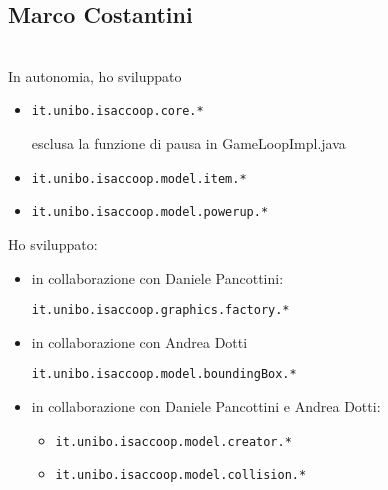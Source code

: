 \documentclass[a4paper,12pt]{report}
\begin{document}
\subsection*{Marco Costantini}
\\In autonomia, ho sviluppato
\begin{itemize}
    \item \begin{verbatim}it.unibo.isaccoop.core.* \end{verbatim} esclusa la funzione di pausa in GameLoopImpl.java
    \item \begin{verbatim}it.unibo.isaccoop.model.item.* \end{verbatim}
    \item \begin{verbatim}it.unibo.isaccoop.model.powerup.* \end{verbatim}
\end{itemize}
Ho sviluppato: 
\begin{itemize}
    \item in collaborazione con Daniele Pancottini: \begin{verbatim}it.unibo.isaccoop.graphics.factory.* \end{verbatim}
    \item in collaborazione con Andrea Dotti \begin{verbatim}it.unibo.isaccoop.model.boundingBox.* \end{verbatim}
    \item in collaborazione con Daniele Pancottini e Andrea Dotti:  
    \begin{itemize}
        \item \begin{verbatim}it.unibo.isaccoop.model.creator.* \end{verbatim} 
        \item \begin{verbatim}it.unibo.isaccoop.model.collision.* \end{verbatim}
    \end{itemize}
\end{itemize} 
\end{document}
